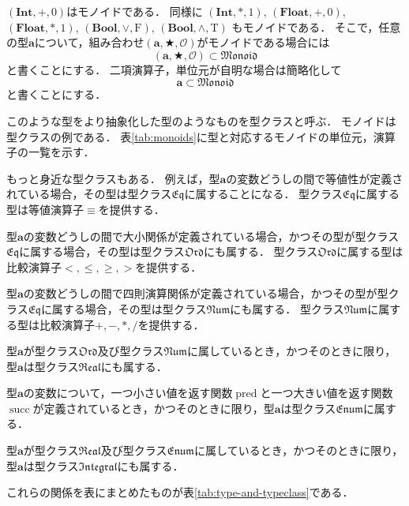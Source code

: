 \documentclass[twocolumn]{jsbook}
\newcommand{\typeclassname}[1]{\mathfrak{#1}}
\newcommand{\typeclassenum}{\typeclassname{Enum}}
\newcommand{\typeclasseq}{\typeclassname{Eq}}
\newcommand{\typeclassintegral}{\typeclassname{Integral}}
\newcommand{\typeclassmonoid}{\typeclassname{Monoid}}
\newcommand{\typeclassnum}{\typeclassname{Num}}
\newcommand{\typeclassord}{\typeclassname{Ord}}
\newcommand{\typeclassreal}{\typeclassname{Real}}
\newcommand{\typename}[1]{\mathbf{#1}}
\newcommand{\typebool}{\typename{Bool}}
\newcommand{\typeint}{\typename{Int}}
\newcommand{\typefloat}{\typename{Float}}
\newcommand{\constantname}[1]{\mathrm{#1}}
\newcommand{\constanttrue}{\constantname{T}}
\newcommand{\constantfalse}{\constantname{F}}
\newcommand{\binaryeq}{\equiv}
\newcommand{\binaryl}{<}
\newcommand{\binaryle}{\le}
\newcommand{\binaryge}{\ge}
\newcommand{\binaryg}{>}
\newcommand{\binaryadd}{+}
\newcommand{\binarysub}{-}
\newcommand{\binarymultiply}{*}
\newcommand{\binarydivide}{/}
\newcommand{\binaryor}{\vee}
\newcommand{\binaryand}{\wedge}
\newcommand{\functionpred}{\mathop{\text{pred}}}
\newcommand{\functionsucc}{\mathop{\text{succ}}}
\newcommand{\isclassof}{\subset}
\newcommand{\mathbinaryop}{\bigstar}
\newcommand{\mathidentity}{\mathcal{O}}
\newcommand{\mathtriple}[3]{(#1,#2,#3)}
\begin{document}
$\mathtriple{\typeint}{+}{0}$はモノイドである．
同様に $\mathtriple{\typeint}{*}{1}$, $\mathtriple{\typefloat}{+}{0}$, $\mathtriple{\typefloat}{*}{1}$, $\mathtriple{\typebool}{\binaryor}{\constantfalse}$, $\mathtriple{\typebool}{\binaryand}{\constanttrue}$ もモノイドである．
そこで，任意の型$\typename{a}$について，組み合わせ$\mathtriple{\typename{a}}{\mathbinaryop}{\mathidentity}$がモノイドである場合には$$\mathtriple{\typename{a}}{\mathbinaryop}{\mathidentity}\isclassof\typeclassmonoid$$と書くことにする．
二項演算子，単位元が自明な場合は簡略化して$$\typename{a}\isclassof\typeclassmonoid$$と書くことにする．

このような型をより抽象化した型のようなものを型クラスと呼ぶ．
モノイドは型クラスの例である．
表\ref{tab:monoids}に型と対応するモノイドの単位元，演算子の一覧を示す．

もっと身近な型クラスもある．
例えば，型$\typename{a}$の変数どうしの間で等値性が定義されている場合，その型は型クラス$\typeclasseq$に属することになる．
型クラス$\typeclasseq$に属する型は等値演算子$\binaryeq$を提供する．

型$\typename{a}$の変数どうしの間で大小関係が定義されている場合，かつその型が型クラス$\typeclasseq$に属する場合，その型は型クラス$\typeclassord$にも属する．
型クラス$\typeclassord$に属する型は比較演算子$\binaryl,\binaryle,\binaryge,\binaryg$を提供する．

型$\typename{a}$の変数どうしの間で四則演算関係が定義されている場合，かつその型が型クラス$\typeclasseq$に属する場合，その型は型クラス$\typeclassnum$にも属する．
型クラス$\typeclassnum$に属する型は比較演算子$\binaryadd,\binarysub,\binarymultiply,\binarydivide$を提供する．

型$\typename{a}$が型クラス$\typeclassord$及び型クラス$\typeclassnum$に属しているとき，かつそのときに限り，型$\typename{a}$は型クラス$\typeclassreal$にも属する．

型$\typename{a}$の変数について，一つ小さい値を返す関数$\functionpred$と一つ大きい値を返す関数$\functionsucc$が定義されているとき，かつそのときに限り，型$\typename{a}$は型クラス$\typeclassenum$に属する．

型$\typename{a}$が型クラス$\typeclassreal$及び型クラス$\typeclassenum$に属しているとき，かつそのときに限り，型$\typename{a}$は型クラス$\typeclassintegral$にも属する．

これらの関係を表にまとめたものが表\ref{tab:type-and-typeclass}である．
\end{document}
